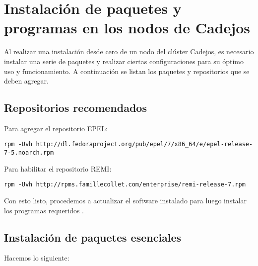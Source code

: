 \chapter{Instalación de paquetes y programas en los nodos de Cadejos}
Al realizar una instalación desde cero de un nodo del clúster Cadejos, es necesario instalar una serie de paquetes y realizar ciertas configuraciones para su óptimo uso y funcionamiento. A continuación se listan los paquetes y repositorios que se deben agregar.

\section{Repositorios recomendados}

Para agregar el repositorio EPEL:

\begin{lstlisting} 
rpm -Uvh http://dl.fedoraproject.org/pub/epel/7/x86_64/e/epel-release-7-5.noarch.rpm
\end{lstlisting}

Para habilitar el repositorio REMI:

\begin{lstlisting} 
rpm -Uvh http://rpms.famillecollet.com/enterprise/remi-release-7.rpm
\end{lstlisting}

Con esto listo, procedemos a actualizar el software instalado para luego instalar los programas requeridos \cite{centosrepos}.

\section{Instalación de paquetes esenciales}

Hacemos lo siguiente:

